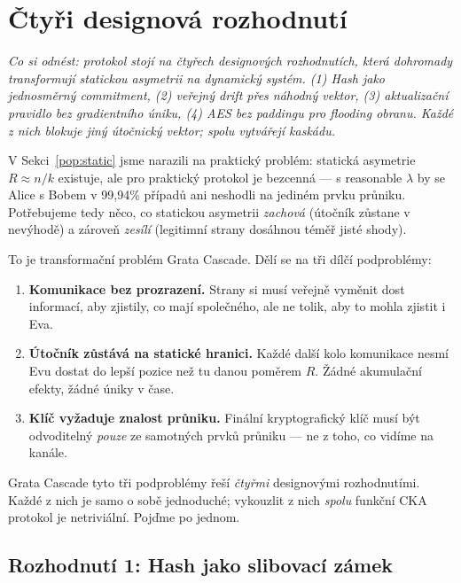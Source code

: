 \documentclass[11pt,a4paper]{article}
\begin{document}
\section{Čtyři designová rozhodnutí}\label{pop:transformation}

\noindent\textit{Co si odnést: protokol stojí na čtyřech designových rozhodnutích, která dohromady transformují statickou asymetrii na dynamický systém. (1) Hash jako jednosměrný commitment, (2) veřejný drift přes náhodný vektor, (3) aktualizační pravidlo bez gradientního úniku, (4) AES bez paddingu pro flooding obranu. Každé z nich blokuje jiný útočnický vektor; spolu vytvářejí kaskádu.}

\medskip

V Sekci~\ref{pop:static} jsme narazili na praktický problém: statická asymetrie $R \approx n/k$ existuje, ale pro praktický protokol je bezcenná --- s reasonable $\lambda$ by se Alice s Bobem v 99,94\% případů ani neshodli na jediném prvku průniku. Potřebujeme tedy něco, co statickou asymetrii \emph{zachová} (útočník zůstane v nevýhodě) a zároveň \emph{zesílí} (legitimní strany dosáhnou téměř jisté shody).

To je transformační problém Grata Cascade. Dělí se na tři dílčí podproblémy:

\begin{enumerate}[leftmargin=*]
\item \textbf{Komunikace bez prozrazení.} Strany si musí veřejně vyměnit dost informací, aby zjistily, co mají společného, ale ne tolik, aby to mohla zjistit i Eva.
\item \textbf{Útočník zůstává na statické hranici.} Každé další kolo komunikace nesmí Evu dostat do lepší pozice než tu danou poměrem $R$. Žádné akumulační efekty, žádné úniky v čase.
\item \textbf{Klíč vyžaduje znalost průniku.} Finální kryptografický klíč musí být odvoditelný \emph{pouze} ze samotných prvků průniku --- ne z toho, co vidíme na kanále.
\end{enumerate}

Grata Cascade tyto tři podproblémy řeší \emph{čtyřmi} designovými rozhodnutími. Každé z nich je samo o sobě jednoduché; vykouzlit z nich \emph{spolu} funkční CKA protokol je netriviální. Pojďme po jednom.

\subsection{Rozhodnutí 1: Hash jako slibovací zámek}\label{pop:design-hash}
\end{document}
